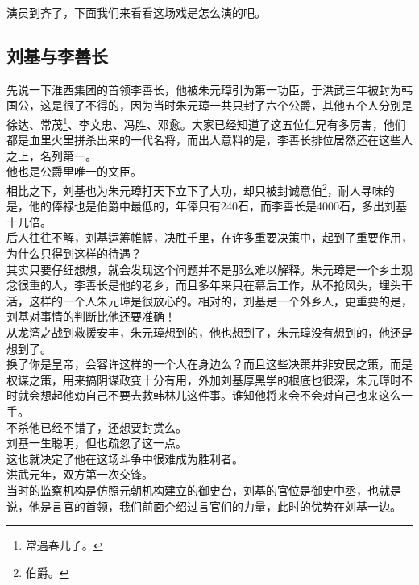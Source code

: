 \begin{multicols}{\theparacolNo}
演员到齐了，下面我们来看看这场戏是怎么演的吧。\\

\subsection{刘基与李善长}
先说一下淮西集团的首领李善长，他被朱元璋引为第一功臣，于洪武三年被封为韩国公，这是很了不得的，因为当时朱元璋一共只封了六个公爵，其他五个人分别是徐达、常茂\footnote{常遇春儿子。}、李文忠、冯胜、邓愈。大家已经知道了这五位仁兄有多厉害，他们都是血里火里拼杀出来的一代名将，而出人意料的是，李善长排位居然还在这些人之上，名列第一。\\

他也是公爵里唯一的文臣。\\

相比之下，刘基也为朱元璋打天下立下了大功，却只被封诚意伯\footnote{伯爵。}，耐人寻味的是，他的俸禄也是伯爵中最低的，年俸只有240石，而李善长是4000石，多出刘基十几倍。\\

后人往往不解，刘基运筹帷幄，决胜千里，在许多重要决策中，起到了重要作用，为什么只得到这样的待遇？\\

其实只要仔细想想，就会发现这个问题并不是那么难以解释。朱元璋是一个乡土观念很重的人，李善长是他的老乡，而且多年来只在幕后工作，从不抢风头，埋头干活，这样的一个人朱元璋是很放心的。相对的，刘基是一个外乡人，更重要的是，刘基对事情的判断比他还要准确！\\

从龙湾之战到救援安丰，朱元璋想到的，他也想到了，朱元璋没有想到的，他还是想到了。\\

换了你是皇帝，会容许这样的一个人在身边么？而且这些决策并非安民之策，而是权谋之策，用来搞阴谋政变十分有用，外加刘基厚黑学的根底也很深，朱元璋时不时就会想起他劝自己不要去救韩林儿这件事。谁知他将来会不会对自己也来这么一手。\\

不杀他已经不错了，还想要封赏么。\\

刘基一生聪明，但也疏忽了这一点。\\

这也就决定了他在这场斗争中很难成为胜利者。\\

洪武元年，双方第一次交锋。\\

当时的监察机构是仿照元朝机构建立的御史台，刘基的官位是御史中丞，也就是说，他是言官的首领，我们前面介绍过言官们的力量，此时的优势在刘基一边。\\


\end{multicols}
